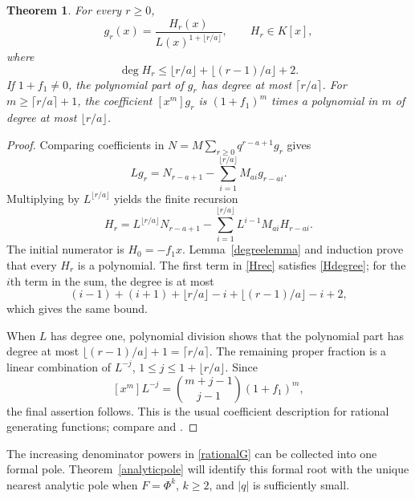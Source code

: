\documentclass[11pt]{amsart}
\newtheorem{theorem}{Theorem}[section]
\theoremstyle{definition}
\theoremstyle{remark}
\numberwithin{equation}{section}
\begin{document}
\begin{theorem}\label{diagonal}
For every $r\ge0$,
\begin{equation}\label{rationalG}
 g_r(x)=\frac{H_r(x)}{L(x)^{1+\lfloor r/a\rfloor}},\qquad H_r\in K[x],
\end{equation}
where
\begin{equation}\label{Hdegree}
 \deg H_r\le\lfloor r/a\rfloor+\lfloor(r-1)/a\rfloor+2.
\end{equation}
If $1+f_1\ne0$, the polynomial part of $g_r$ has degree at most $\lceil r/a\rceil$. For $m\ge\lceil r/a\rceil+1$, the coefficient $[x^m]g_r$ is $(1+f_1)^m$ times a polynomial in $m$ of degree at most $\lfloor r/a\rfloor$.
\end{theorem}
\begin{proof}
Comparing coefficients in $N=M\sum_{r\ge0}q^{r-a+1}g_r$ gives
\[
 Lg_r=N_{r-a+1}-\sum_{i=1}^{\lfloor r/a\rfloor}M_{ai}g_{r-ai}.
\]
Multiplying by $L^{\lfloor r/a\rfloor}$ yields the finite recursion
\begin{equation}\label{Hrec}
 H_r=L^{\lfloor r/a\rfloor}N_{r-a+1}
 -\sum_{i=1}^{\lfloor r/a\rfloor}L^{i-1}M_{ai}H_{r-ai}.
\end{equation}
The initial numerator is $H_0=-f_1x$. Lemma~\ref{degreelemma} and induction prove that every $H_r$ is a polynomial. The first term in \eqref{Hrec} satisfies \eqref{Hdegree}; for the $i$th term in the sum, the degree is at most
\[
 (i-1)+(i+1)+\lfloor r/a\rfloor-i+\lfloor(r-1)/a\rfloor-i+2,
\]
which gives the same bound.

When $L$ has degree one, polynomial division shows that the polynomial part has degree at most $\lfloor(r-1)/a\rfloor+1=\lceil r/a\rceil$. The remaining proper fraction is a linear combination of $L^{-j}$, $1\le j\le1+\lfloor r/a\rfloor$. Since
\[
 [x^m]L^{-j}=\binom{m+j-1}{j-1}(1+f_1)^m,
\]
the final assertion follows. This is the usual coefficient description for rational generating functions; compare \cite[Chapter 4]{Stanley} and \cite[Chapter IV]{FlajoletSedgewick}.
\end{proof}

The increasing denominator powers in \eqref{rationalG} can be collected into one formal pole. Theorem~\ref{analyticpole} will identify this formal root with the unique nearest analytic pole when $F=\Phi^k$, $k\ge2$, and $|q|$ is sufficiently small.
\end{document}
